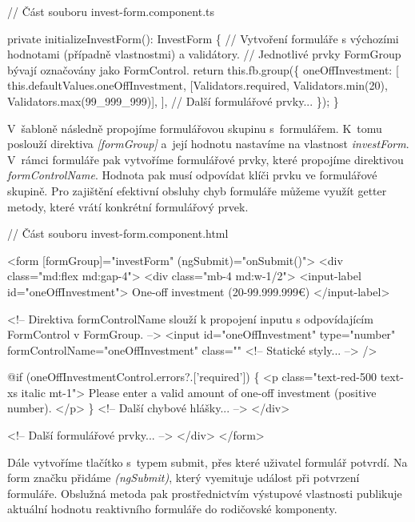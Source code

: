 \begin{prog}
// Část souboru invest-form.component.ts

private initializeInvestForm(): InvestForm \{
  // Vytvoření formuláře s výchozími hodnotami 
    (případně vlastnostmi) a validátory.
  // Jednotlivé prvky FormGroup bývají označovány jako FormControl.
  return this.fb.group(\{
    oneOffInvestment: [
      this.defaultValues.oneOffInvestment,
      [Validators.required, Validators.min(20), Validators.max(99_999_999)],
    ],
    // Další formulářové prvky... 
  \});
\}
\end{prog}

V~šabloně následně propojíme formulářovou skupinu s~formulářem. K~tomu poslouží direktiva \emph{[formGroup]} a~její hodnotu nastavíme na vlastnost \emph{investForm}. 
V~rámci formuláře pak vytvoříme formulářové prvky, které propojíme direktivou \emph{formControlName}. Hodnota pak musí odpovídat klíči prvku ve formulářové skupině. 
Pro zajištění efektivní obsluhy chyb formuláře můžeme využít getter metody, které vrátí konkrétní formulářový prvek.

\begin{prog}
// Část souboru invest-form.component.html

<form [formGroup]="investForm" (ngSubmit)="onSubmit()">
  <div class="md:flex md:gap-4">
    <div class="mb-4 md:w-1/2">
      <input-label id="oneOffInvestment">
        One-off investment (20-99.999.999€)
      </input-label>

      <!-- Direktiva formControlName slouží k propojení inputu 
        s odpovídajícím FormControl v FormGroup. -->
      <input
        id="oneOffInvestment"
        type="number"
        formControlName="oneOffInvestment"
        class="" <!-- Statické styly... -->
      />

      @if (oneOffInvestmentControl.errors?.['required']) \{
        <p class="text-red-500 text-xs italic mt-1">
          Please enter a valid amount of one-off investment (positive number).
        </p>
      \}
      <!-- Další chybové hlášky... -->
    </div>

    <!-- Další formulářové prvky... -->
  </div>
</form>
\end{prog}

Dále vytvoříme tlačítko s~typem submit, přes které uživatel formulář potvrdí. Na form značku přidáme \emph{(ngSubmit)}, který vyemituje událost při potvrzení formuláře. 
Obslužná metoda pak prostřednictvím výstupové vlastnosti publikuje aktuální hodnotu reaktivního formuláře do rodičovské komponenty.

